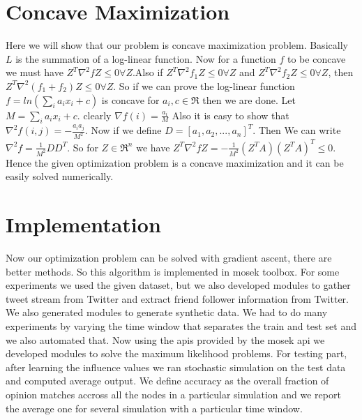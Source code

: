 \section*{Concave Maximization}
Here we will show that our problem is concave maximization problem. Basically $L$ is the summation of a log-linear function. Now for a function $f$ to be concave we must have $Z^{T}\nabla^{2}fZ \leq 0 \forall Z$.Also if $Z^{T}\nabla^{2}f_{1}Z \leq 0 \forall Z$ and $Z^{T}\nabla^{2}f_{2}Z \leq 0 \forall Z$, then $Z^{T}\nabla^{2}(f_{1}+f_{2})Z \leq 0 \forall Z$. So if we can prove the log-linear function $f = ln(\displaystyle\sum_{i}a_{i}x_{i} + c)$ is concave for $a_i,c \in \Re$ then we are done. Let $M = \displaystyle\sum_{i}a_{i}x_{i} + c$.
clearly $\nabla f (i) = \frac{a_i}{M}$
Also it is easy to show that $\nabla^2 f (i,j) = -\frac{a_ia_j}{M^2}$. Now if we define $D = [a_1,a_2,...,a_n]^T$. Then We can write $\nabla^2 f = \frac{1}{M^2} DD^T$. So for $Z \in \Re^n$ we have $Z^{T}\nabla^{2}fZ = -\frac{1}{M^2} (Z^TA)(Z^TA)^T \leq 0$. Hence the given optimization problem is a concave maximization and it can be easily solved numerically.
\section*{Implementation}
Now our optimization problem can be solved with gradient ascent, there are better methods. So this algorithm is implemented in mosek toolbox. For some experiments we used the given dataset, but we also developed modules to gather tweet stream from Twitter and extract friend follower information from Twitter. We also generated modules to generate synthetic data. We had to do many experiments by varying the time window that separates the train and test set and we also automated that. Now using the apis provided by the mosek api we developed modules to solve the maximum likelihood problems. For testing part, after learning the influence values we ran stochastic simulation on the test data and computed average output. We define accuracy as the overall fraction of opinion matches accross all the nodes in a particular simulation and we report the average one for several simulation with a particular time window.
